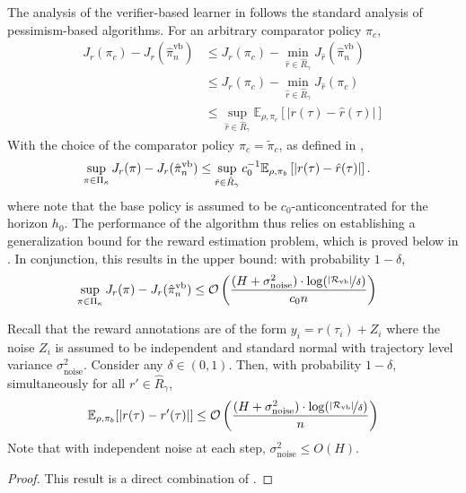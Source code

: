 The analysis of the verifier-based learner in  follows the standard analysis of pessimism-based algorithms. For an arbitrary comparator policy $\pi_c$,
\begin{align}
    J_r (\pi_c) - J_r ( \hat{\pi}_n^{\text{vb}} ) &\le J_r (\pi_c) - \min_{\hat{r} \in \hat{R}_\gamma} J_{\hat{r}} ( \hat{\pi}_n^{\text{vb}} ) \nonumber\\
    &\le J_r (\pi_c) - \min_{\hat{r} \in \hat{R}_\gamma} J_{\hat{r}} ( \pi_c ) \nonumber\\
    &\le \sup_{\hat{r} \in \hat{R}_\gamma} \mathbb{E}_{\rho, \pi_c} \left[ | r (\tau) - \hat{r} (\tau) | \right]  \label{eq:003}
\end{align}
With the choice of the comparator policy $\pi_c = \widetilde{\pi}_c$, as defined in ,
\begin{align*}
    \sup_{\pi \in \Pi_\kappa} J_r (\pi) - J_r ( \hat{\pi}_n^{\text{vb}} ) &\le \sup_{\hat{r} \in \hat{R}_\gamma} c_0^{-1} \mathbb{E}_{\rho, \pi_b} \left[ | r (\tau) - \hat{r} (\tau) | \right].
\end{align*}
where note that the base policy is assumed to be $c_0$-anticoncentrated for the horizon $h_0$. The performance of the algorithm thus relies on establishing a generalization bound for the reward estimation problem, which is proved below in . In conjunction, this results in the upper bound: with probability $1-\delta$,
\begin{align*}
\sup_{\pi \in \Pi_\kappa} J_r (\pi) - J_r ( \hat{\pi}_n^{\text{vb}} ) &\le {\mathcal{O}} \left( \frac{(H + \sigma_{\text{noise}}^2) \cdot \log (\nicefrac{|\mathcal{R}_{\text{vb}}|}{\delta})}{c_0 n} \right)
\end{align*}

\begin{theorem} \label{theorem:finalerror}
Recall that the reward annotations are of the form $y_i = r(\tau_i) + Z_i$ where the noise $Z_i$ is assumed to be independent and standard normal with trajectory level variance $\sigma_{\text{noise}}^2$.
Consider any $\delta \in (0,1)$. Then, with probability $1-\delta$, simultaneously for all $r' \in \hat{R}_{\gamma}$,
\begin{align*}
    \mathbb{E}_{\rho,\pi_b} [|r(\tau) - r'(\tau)|] \le {\mathcal{O}} \left( \frac{(H + \sigma_{\text{noise}}^2) \cdot \log (\nicefrac{|\mathcal{R}_{\text{vb}}|}{\delta})}{n} \right)
\end{align*}
Note that with independent noise at each step, $\sigma_{\text{noise}}^2 \le O(H)$.
\end{theorem}
\begin{proof}
This result is a direct combination of .
\end{proof}


